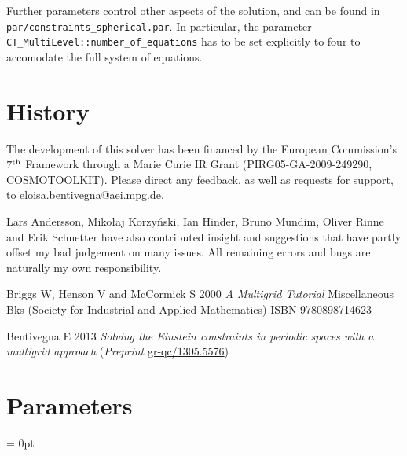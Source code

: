 Further parameters control other aspects of the solution, and can be
found in \texttt{par/constraints\_spherical.par}. In particular, the
parameter \texttt{CT\_MultiLevel::number\_of\_equations} has to be set
explicitly to four to accomodate the full system of equations.

\section{History}
The development of this solver has been financed by the European
Commission's $7^{\rm th}$ Framework through a Marie Curie IR Grant 
(PIRG05-GA-2009-249290, COSMOTOOLKIT). Please direct any feedback, 
as well as requests for support, to 
\href{mailto:eloisa.bentivegna@aei.mpg.de}{eloisa.bentivegna@aei.mpg.de}.

Lars Andersson, Miko\l{}aj Korzy\'nski, Ian Hinder, Bruno Mundim, 
Oliver Rinne and Erik Schnetter have also contributed insight and
suggestions that have partly offset my bad judgement on many issues.
All remaining errors and bugs are naturally my own responsibility. 

\begin{thebibliography}{9}

Briggs W, Henson V and McCormick S 2000 {\em A Multigrid Tutorial\/}
  Miscellaneous Bks (Society for Industrial and Applied Mathematics) ISBN
  9780898714623

Bentivegna E 2013 \textit{Solving the Einstein constraints in periodic spaces 
with a multigrid approach} (\textit{Preprint} 
\href{http://arxiv.org/abs/arXiv:1305.5576}{gr-qc/1305.5576})

\end{thebibliography}




\section{Parameters} 


\parskip = 0pt

\setlength{\tableWidth}{160mm}

\setlength{\paraWidth}{\tableWidth}
\setlength{\descWidth}{\tableWidth}
\settowidth{\maxVarWidth}{exact\_laplacian\_gfname}

\addtolength{\paraWidth}{-\maxVarWidth}
\addtolength{\paraWidth}{-\columnsep}
\addtolength{\paraWidth}{-\columnsep}
\addtolength{\paraWidth}{-\columnsep}

